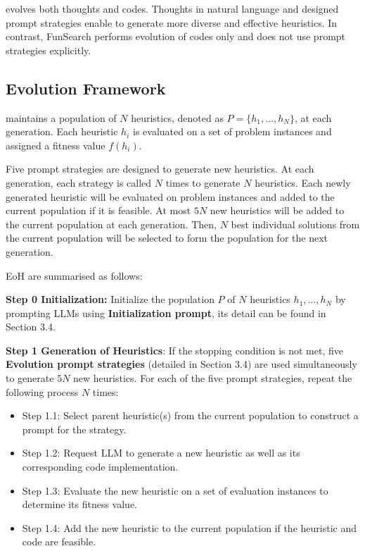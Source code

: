 
\ourmethod{} evolves both thoughts and codes. Thoughts in natural language and designed prompt strategies enable \ourmethod{} to generate more diverse and effective heuristics. In contrast, FunSearch performs evolution of codes only and does not use prompt strategies explicitly.



\subsection{Evolution Framework}

\ourmethod{} maintains a population of $N$ heuristics, denoted as $P = \{h_1, \dots, h_N\}$, at each generation. Each heuristic $h_i$ is evaluated on a set of problem instances and assigned a fitness value $f(h_i)$.  

Five prompt strategies are designed to generate new heuristics. At each generation, each strategy is called $N$ times to generate $N$ heuristics. Each newly generated heuristic will be evaluated on problem instances and added to the current population if it is feasible. At most $5N$ new heuristics will be added to the current population at each generation. Then, $N$ best individual solutions from the current population will be selected to form the population for the next generation. 

EoH are summarised as follows: 

\textbf{Step 0 Initialization:} Initialize the population $P$ of $N$ heuristics $h_1, \ldots, h_N$ by prompting LLMs using \textbf{Initialization prompt}, its detail can be found in Section 3.4.

\textbf{Step 1 Generation of Heuristics}: If the stopping condition is not met, five \textbf{Evolution prompt strategies} (detailed in Section 3.4) are used simultaneously to generate $5N$ new heuristics. For each of the five prompt strategies, repeat the following process $N$ times: 
\begin{itemize}
    \item Step 1.1: Select parent heuristic(s) from the current population to construct a prompt for the strategy.
    \item Step 1.2: Request LLM  to generate a new heuristic as well as its corresponding code implementation. 
    \item Step 1.3: Evaluate the new heuristic on a set of evaluation instances to determine its fitness value. 
    \item Step 1.4: Add the new heuristic to the current population if the heuristic and code are feasible.
\end{itemize}

